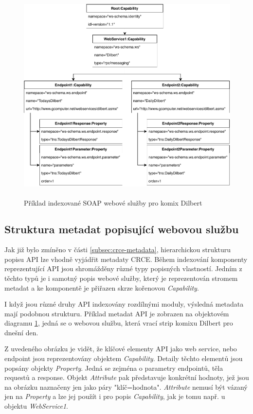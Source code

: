 \documentclass[czech,DP]{thesiskiv}
\begin{document}
\begin{figure}[h]
	\centering
	\includegraphics[height=11cm]{indexed-api-example}
	\caption{Příklad indexované SOAP webové služby pro komix Dilbert }
	\label{fig:indexed-api-example}
\end{figure}

\subsection{Struktura metadat popisující webovou službu}

Jak již bylo zmíněno v části \ref{subsec:crce-metadata}, hierarchickou strukturu popisu API lze vhodně vyjádřit metadaty CRCE. Během indexování komponenty reprezentující API jsou shromážděny různé typy popisných vlastností. Jedním z těchto typů je i samotný popis webové služby, který je reprezentován stromem metadat a ke komponentě je přiřazen skrze  kořenovou \textit{Capability}.   

I když jsou různé druhy API indexovány rozdílnými moduly, výsledná metadata mají podobnou strukturu. Příklad metadat API je zobrazen na objektovém diagramu \ref{fig:indexed-api-example}, jedná se o webovou službu, která vrací strip komixu Dilbert pro dnešní den.

Z uvedeného obrázku je vidět, že klíčové elementy API jako web service, nebo endpoint jsou reprezentovány objektem \textit{Capability}. Detaily těchto elementů jsou popsány objekty \textit{Property}. Jedná se zejména o parametry endpointů, těla requestů a response. Objekt \textit{Attribute} pak představuje konkrétní hodnoty, jež jsou na obrázku naznačeny jen jako páry "klíč=hodnota". \textit{Attribute} nemusí být vázaný jen na \textit{Property} a lze jej použít i pro popis \textit{Capability}, jak je tomu např. u objektu \textit{WebService1}.
\end{document}
